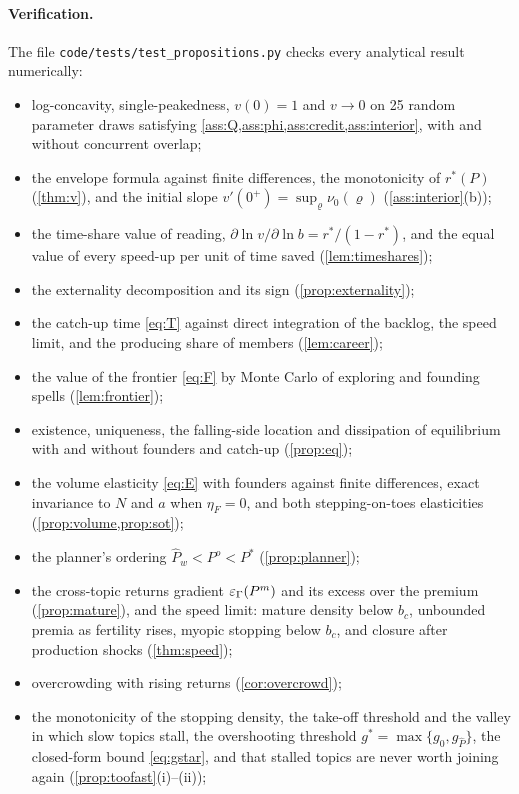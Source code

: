 \paragraph{Verification.} The file \texttt{code/tests/test\_propositions.py}
checks every analytical result numerically:
\begin{itemize}
\item log-concavity, single-peakedness, $v(0)=1$ and $v\to0$ on 25 random parameter draws satisfying \cref{ass:Q,ass:phi,ass:credit,ass:interior}, with and without concurrent overlap;
\item the envelope formula against finite differences, the monotonicity of $r^*(P)$ (\cref{thm:v}), and the initial slope $v'(0^+)=\sup_\varrho\nu_0(\varrho)$ (\cref{ass:interior}(b));
\item the time-share value of reading, $\partial\ln v/\partial\ln b=r^*/(1-r^*)$, and the equal value of every speed-up per unit of time saved (\cref{lem:timeshares});
\item the externality decomposition and its sign (\cref{prop:externality});
\item the catch-up time \eqref{eq:T} against direct integration of the backlog, the speed limit, and the producing share of members (\cref{lem:career});
\item the value of the frontier \eqref{eq:F} by Monte Carlo of exploring and founding spells (\cref{lem:frontier});
\item existence, uniqueness, the falling-side location and dissipation of equilibrium with and without founders and catch-up (\cref{prop:eq});
\item the volume elasticity \eqref{eq:E} with founders against finite differences, exact invariance to $N$ and $a$ when $\eta_F=0$, and both stepping-on-toes elasticities (\cref{prop:volume,prop:sot});
\item the planner's ordering $\hat P_w<P^o<P^*$ (\cref{prop:planner});
\item the cross-topic returns gradient $\varepsilon_\Gamma(P^m)$ and its excess over the premium (\cref{prop:mature}), and the speed limit: mature density below $b_c$, unbounded premia as fertility rises, myopic stopping below $b_c$, and closure after production shocks (\cref{thm:speed});
\item overcrowding with rising returns (\cref{cor:overcrowd});
\item the monotonicity of the stopping density, the take-off threshold and the valley in which slow topics stall, the overshooting threshold $g^*=\max\{g_0,g_{\hat P}\}$, the closed-form bound \eqref{eq:gstar}, and that stalled topics are never worth joining again (\cref{prop:toofast}(i)--(ii));

\end{itemize}
